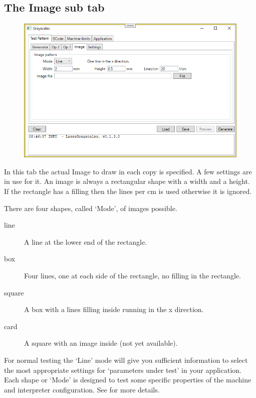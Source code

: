 \subsection{The Image sub tab}\label{TestPatternImageTab}
\begin{figure}[h!]
    \centering
    \includegraphics[width=0.8\linewidth]{./images/Image.png}
\end{figure}

In this tab the actual Image to draw in each copy is specified. A few settings are in use for it. An image is always a rectangular shape with a width and a height.
If the rectangle has a filling then the lines per cm is used otherwise it is ignored.

There are four shapes, called `Mode', of images possible.
\begin{description}
    \item[line]   A line at the lower end of the rectangle.
    \item[box]    Four lines, one at each side of the rectangle, no filling in the rectangle.
    \item[square] A box with a lines filling inside running in the x direction.
    \item[card]   A square with an image inside (not yet available).
\end{description}

For normal testing the `Line' mode will give you sufficient information to select the most appropriate settings for `parameters under test' in your application.
Each shape or `Mode' is designed to test some specific properties of the machine and interpreter configuration. See  for more details.

